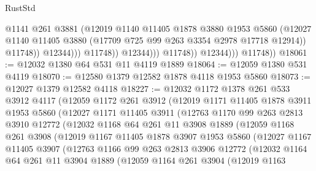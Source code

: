\begin{lexlean}{RustStd}
\begin{coremodule}
{\begin{coremodule}
{{{{{{{{{{{{{{{{{{{{{{{{{{{{{                                    @1141
                                    @261
                                    @3881
                                    (@12019
                                      @1140
                                      @11405
                                      @1878
                                      @3880
                                      @1953
                                      @5860
                                      (@12027
                                        @1140
                                        @11405
                                        @3880
                                        (@17709 @725 @99 @263 @3354 @2978 @17718 @12914))
                                      @11748))
                                  @12344)))
                            @11748))
                        @12344)))
                  @11748))
              @12344)))
        @11748))
@18061 := @12032 @1380 @64 @531 @11 @4119 @1889
@18064 := @12059 @1380 @531 @4119
@18070 := @12580 @1379 @12582 @1878 @4118 @1953 @5860
@18073 := @12027 @1379 @12582 @4118
@18227 := @12032
    @1172
    @1378
    @261
    @533
    @3912
    @4117
    (@12059
      @1172
      @261
      @3912
      (@12019
        @1171
        @11405
        @1878
        @3911
        @1953
        @5860
        (@12027
          @1171
          @11405
          @3911
          (@12763
            @1170
            @99
            @263
            @2813
            @3910
            @12772
            (@12032
              @1168
              @64
              @261
              @11
              @3908
              @1889
              (@12059
                @1168
                @261
                @3908
                (@12019
                  @1167
                  @11405
                  @1878
                  @3907
                  @1953
                  @5860
                  (@12027
                    @1167
                    @11405
                    @3907
                    (@12763
                      @1166
                      @99
                      @263
                      @2813
                      @3906
                      @12772
                      (@12032
                        @1164
                        @64
                        @261
                        @11
                        @3904
                        @1889
                        (@12059
                          @1164
                          @261
                          @3904
                          (@12019
                            @1163
}}}}}}}}}}}}}}}}}}}}}}}}}}}}}
\end{coremodule}}
\end{coremodule}
\end{lexlean}
